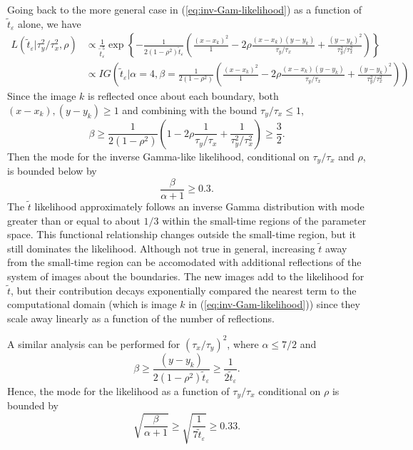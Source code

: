 \documentclass[10pt]{article}
\begin{document}
\begin{enumerate}
    Going back to the more general case in
    (\ref{eq:inv-Gam-likelihood}) as a function of $\tilde{t}_\varepsilon$ alone, we have
    \begin{align*}
      L(\tilde{t}_\varepsilon | \tau_y^2/\tau_x^2, \rho) &\propto
                                                           \frac{1}{\tilde{t}_\varepsilon^5} \exp\left\{
                                                           -\frac{1}{2(1-\rho^2)\tilde{t}_\varepsilon} \left( \frac{(x -
                                                           x_k)^2}{1} - 2\rho \frac{(x-x_k)(y-y_k)}{\tau_y/\tau_x} +
                                                           \frac{(y - y_k)^2}{\tau_y^2/\tau_x^2} \right) \right\} \\
                                                         &\propto IG\left( \tilde{t}_\varepsilon | \alpha = 4, \beta = \frac{1}{2(1-\rho^2)} \left( \frac{(x -
                                                           x_k)^2}{1} - 2\rho \frac{(x-x_k)(y-y_k)}{\tau_y/\tau_x} +
                                                           \frac{(y - y_k)^2}{\tau_y^2/\tau_x^2} \right)\right)
      \end{align*}
      Since the image $k$ is reflected once about each boundary, both
      $(x-x_k), (y-y_k) \geq 1$ and combining with the bound $\tau_y/\tau_x \leq 1$,
      \[
        \beta \geq \frac{1}{2(1-\rho^2)} \left( 1 - 2\rho
          \frac{1}{\tau_y/\tau_x} + \frac{1}{\tau_y^2/\tau_x^2}
        \right) \geq \frac{3}{2}.
      \]
      Then the mode for the inverse Gamma-like likelihood, conditional on
      $\tau_y/\tau_x$ and $\rho$, is bounded below by
      \[
        \frac{\beta}{\alpha+1} \geq 0.3.
      \]
      The $\tilde{t}$ likelihood approximately follows an inverse
      Gamma distribution with mode greater than or equal to about
      $1/3$ within the small-time regions of the parameter space. This
      functional relationship changes outside the small-time region,
      but it still dominates the likelihood. Although not true in
      general, increasing $\tilde{t}$ away from the small-time region
      can be accomodated with additional reflections of the system of
      images about the boundaries. The new images add to the
      likelihood for $\tilde{t}$, but their contribution decays
      exponentially compared the nearest term to the computational
      domain (which is image $k$ in (\ref{eq:inv-Gam-likelihood})) since they
      scale away linearly as a function of the number of reflections.

      A similar analysis can be performed for $(\tau_x/\tau_y)^2$, where $\alpha \leq 7/2$ and 
      \[
        \beta \geq \frac{(y-y_k)}{2(1-\rho^2)\tilde{t}_\varepsilon} \geq \frac{1}{2\tilde{t}_\varepsilon}.
      \]
      Hence, the mode for the likelihood as a function of
      $\tau_y/\tau_x$ conditional on $\rho$ is bounded by
      \[
        \sqrt{\frac{\beta}{\alpha+1}} \geq \sqrt{\frac{1}{7\tilde{t}_\varepsilon}} \geq 0.33.
      \]


\end{enumerate}
\end{document}
